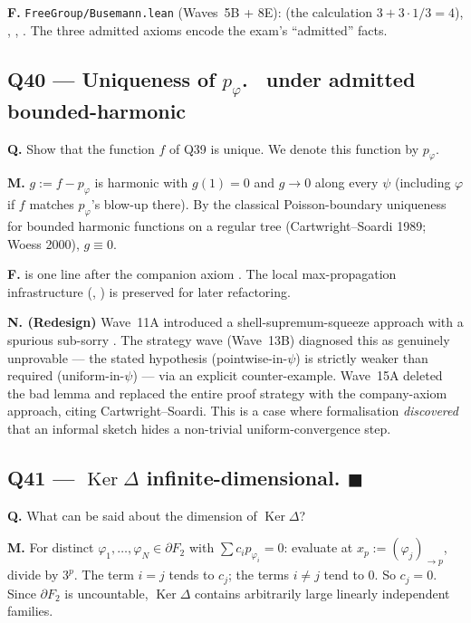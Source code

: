 \documentclass[11pt,a4paper]{article}
\newcommand{\done}[1]{\textcolor{donegreen}{\textbf{#1}}}
\newcommand{\todoc}[1]{\textcolor{todoamber}{\textbf{#1}}}
\newcommand{\lmod}[1]{\texttt{\small #1}}
\newcommand{\Ker}{\operatorname{Ker}}
\newcommand{\BFG}{\partial F_2}
\theoremstyle{plain}
\theoremstyle{definition}
\begin{document}
\textbf{F.} \lmod{FreeGroup/Busemann.lean} (Waves~5B + 8E):
 (the calculation
$3 + 3 \cdot 1/3 = 4$),
,
,
. The three admitted
 axioms encode the exam's ``admitted'' facts.

\subsection{Q40 --- Uniqueness of $p_\varphi$. \todoc{\textopenbullet}{\normalfont\ under admitted bounded-harmonic}}

\textbf{Q.} Show that the function $f$ of Q39 is unique. We denote
this function by $p_\varphi$.

\textbf{M.} $g := f - p_\varphi$ is harmonic with $g(1) = 0$ and
$g \to 0$ along every $\psi$ (including $\varphi$ if $f$ matches
$p_\varphi$'s blow-up there). By the classical Poisson-boundary
uniqueness for bounded harmonic functions on a regular tree
(Cartwright--Soardi 1989; Woess 2000), $g \equiv 0$.

\textbf{F.}  is one line after the
companion axiom . The
local max-propagation infrastructure (,
) is
preserved for later refactoring.

\textbf{N. (Redesign)} Wave~11A introduced a shell-supremum-squeeze
approach with a spurious sub-sorry .
The strategy wave (Wave~13B) diagnosed this as genuinely
unprovable --- the stated hypothesis (pointwise-in-$\psi$) is
strictly weaker than required (uniform-in-$\psi$) --- via an
explicit counter-example. Wave~15A deleted the bad lemma and
replaced the entire proof strategy with the company-axiom approach,
citing Cartwright--Soardi. This is a case where formalisation
\emph{discovered} that an informal sketch hides a non-trivial
uniform-convergence step.

\subsection{Q41 --- $\Ker\Delta$ infinite-dimensional. \done{$\blacksquare$}}

\textbf{Q.} What can be said about the dimension of $\Ker \Delta$?

\textbf{M.} For distinct $\varphi_1, \ldots, \varphi_N \in \BFG$
with $\sum c_i p_{\varphi_i} = 0$: evaluate at $x_p := (\varphi_j)_{\to p}$,
divide by $3^p$. The term $i = j$ tends to $c_j$; the terms $i \neq j$
tend to $0$. So $c_j = 0$. Since $\BFG$ is uncountable,
$\Ker\Delta$ contains arbitrarily large linearly independent
families.
\end{document}
